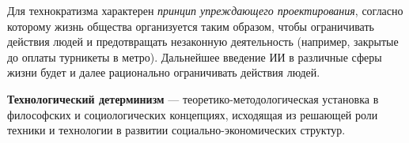 
Для технократизма характерен \textit{принцип упреждающего проектирования}, согласно которому жизнь общества организуется таким образом, чтобы ограничивать действия людей и предотвращать незаконную деятельность (например, закрытые до оплаты турникеты в метро). Дальнейшее введение ИИ в различные сферы жизни будет и далее рационально ограничивать действия людей.




\textbf{Технологический детерминизм} --- теоретико-методологическая установка в философских и социологических концепциях, исходящая из решающей роли техники и технологии в развитии социально-экономических структур.


